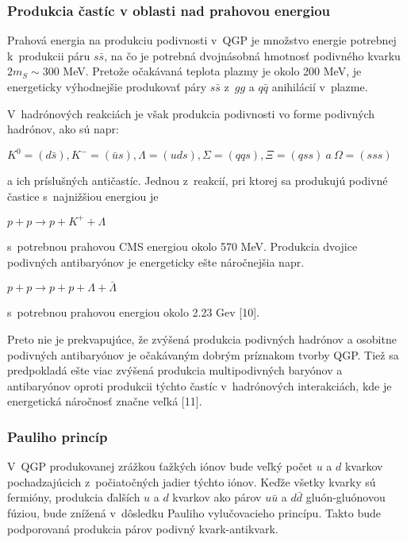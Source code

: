 \subsubsection{Produkcia častíc v oblasti nad prahovou energiou} 
Prahová energia na produkciu podivnosti v~QGP je množstvo
energie potrebnej k~produkcii páru $s\bar{s}$, na čo je potrebná
dvojnásobná  hmotnosť podivného kvarku $2m_{S} \sim 300$ MeV.
Pretože očakávaná teplota plazmy je okolo 200 MeV, je
energeticky výhodnejšie produkovať páry $s\bar{s}$ z~$gg$ a
$q\bar{q}$ anihilácií v~plazme.

V~hadrónových reakciách je však produkcia podivnosti vo forme
podivných hadrónov, ako sú napr:
\begin{center}
 $ K^{0}=(d\bar{s}), K^{-}=(\bar{u}s), \Lambda=(uds), \Sigma=(qqs), 
 \Xi=(qss) \: a \: \Omega=(sss)$ 
\end{center}
 a ich  príslušných antičastíc. Jednou z~reakcií, pri
ktorej sa 
 pro\-du\-ku\-jú po\-di\-vné častice s~najnižšiou energiou
je 
\begin{center}
 $p + p \longrightarrow p + K^{+} + \Lambda$ 
\end{center}
s~potrebnou prahovou CMS energiou okolo 570 MeV. Produkcia dvojice 
podivných anti\-ba\-ryónov je energeticky ešte
náročnejšia napr. 
\begin{center}
  $p + p \longrightarrow p + p + \Lambda + \bar{\Lambda}$
\end{center}
s~potrebnou prahovou energiou okolo 2.23 Gev [10].

Preto nie je prekvapujúce, že zvýšená produkcia podivných
hadrónov a osobitne podivných antibaryónov je očakávaným
dobrým príznakom tvorby QGP. Tiež sa predpokladá ešte viac
zvýšená produkcia multipodivných baryónov a antibaryónov oproti
produkcii týchto častíc v~hadrónových interakciách, kde je
energetická náročnosť značne veľká [11].
  
\subsubsection{Pauliho princíp}
V~QGP produkovanej zrážkou ťažkých iónov bude
veľký počet $u$ a $d$ kvarkov pochadzajúcich
z~počiatočných jadier týchto iónov. Keďže všetky kvarky sú
fermióny, produkcia ďalších $u$ a $d$ kvarkov ako párov
$u\bar{u}$ a $d\bar{d}$ gluón-gluónovou fúziou, bude znížená
v~dôsledku Pauliho vylučovacieho princípu. Takto bude
podporovaná produkcia párov podivný kvark-antikvark.  

